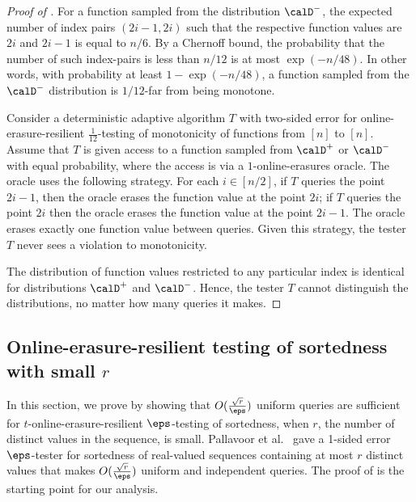 \documentclass[11pt]{article}
\numberwithin{equation}{section}
\theoremstyle{definition}
\theoremstyle{plain}
\begin{document}
\begin{proof}[Proof of ]
	For a function sampled from the distribution $\calD^-$, the expected number of index pairs $(2i-1, 2i)$ such that the respective function values are $2i$ and $2i-1$ is equal to $n/6$. 
	By a Chernoff bound, the probability that the number of such index-pairs is less than $n/12$ is at most $\exp(-n/48)$.
	In other words, with probability at least $1 - \exp(-n/48)$, a function sampled from the $\calD^-$ distribution is $1/12$-far from being monotone.
	
	Consider a deterministic adaptive algorithm $T$ with two-sided error for online-erasure-resilient $\frac{1}{12}$-testing of monotonicity of functions from $[n]$ to $[n]$. 
	Assume that $T$ is given access to a function sampled from $\calD^+$ or $\calD^-$ with equal probability, where the access is via a $1$-online-erasures oracle.
	The oracle uses the following strategy.
	For each $i \in [n/2]$, if $T$ queries the point $2i-1$, then the oracle erases the function value at the point $2i$; if $T$ queries the point $2i$ then the oracle erases the function value at the point $2i-1$. The oracle erases exactly one function value between queries. Given this strategy, the tester $T$ never sees a violation to monotonicity. 
	
	The distribution of function values restricted to any particular index is identical for distributions $\calD^+$ and $\calD^-$. Hence, the tester $T$ cannot distinguish the distributions, no matter how many queries it makes. 
\end{proof}



%
\subsection{Online-erasure-resilient testing of sortedness with small $r$}

In this section, we prove  by showing that $O(\frac{\sqrt{r}}{\eps})$ uniform queries are sufficient for $t$-online-erasure-resilient $\eps$-testing of sortedness, when $r$, the number of distinct values in the sequence, is small. 
Pallavoor et al.~\cite{PRV18} gave a 1-sided error $\eps$-tester for sortedness of real-valued sequences containing at most $r$ distinct values that makes $O(\frac{\sqrt{r}}{\eps})$ uniform and independent queries. 
The proof of \cite[Theorem 1.5]{PRV18} is the starting point for our analysis. 
\end{document}
